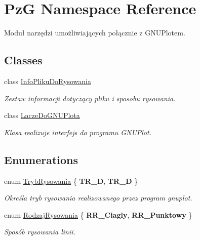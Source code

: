 \hypertarget{namespace_pz_g}{\section{Pz\+G Namespace Reference}
\label{namespace_pz_g}
}


Moduł narzędzi umożliwiających połącznie z G\+N\+U\+Plotem.  


\subsection*{Classes}
\begin{DoxyCompactItemize}
\item 
class \hyperlink{class_pz_g_1_1_info_pliku_do_rysowania}{Info\+Pliku\+Do\+Rysowania}
\begin{DoxyCompactList}\small\item\em Zestaw informacji dotyczący pliku i sposobu rysowania. \end{DoxyCompactList}\item 
class \hyperlink{class_pz_g_1_1_lacze_do_g_n_u_plota}{Lacze\+Do\+G\+N\+U\+Plota}
\begin{DoxyCompactList}\small\item\em Klasa realizuje interfejs do programu G\+N\+U\+Plot. \end{DoxyCompactList}\end{DoxyCompactItemize}
\subsection*{Enumerations}
\begin{DoxyCompactItemize}
\item 
enum \hyperlink{namespace_pz_g_aeedae1ef10c66d720f9e89de408ca4ca}{Tryb\+Rysowania} \{ {\bfseries T\+R\+\_\+D}, 
{\bfseries T\+R\+\_\+D}
 \}
\begin{DoxyCompactList}\small\item\em Określa tryb rysowania realizowanego przez program {\ttfamily gnuplot}. \end{DoxyCompactList}\item 
enum \hyperlink{namespace_pz_g_a705c92106f39b7d0c34a6739d10ff0b6}{Rodzaj\+Rysowania} \{ {\bfseries R\+R\+\_\+\+Ciagly}, 
{\bfseries R\+R\+\_\+\+Punktowy}
 \}
\begin{DoxyCompactList}\small\item\em Sposób rysowania linii. \end{DoxyCompactList}\end{DoxyCompactItemize}
